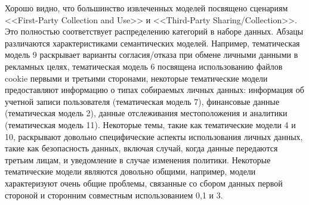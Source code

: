 \documentclass[../main]{subfiles}
\begin{document}
Хорошо видно, что большинство извлеченных моделей посвящено сценариям <<First-Party Collection and Use>> и <<Third-Party Sharing/Collection>>. Это полностью соответствует распределению категорий в наборе данных. Абзацы различаются характеристиками семантических моделей. Например, тематическая модель 9 раскрывает варианты согласия/отказа при обмене личными данными в рекламных целях, тематическая модель 6 посвящена использованию файлов cookie первыми и третьими сторонами, некоторые тематические модели предоставляют информацию о типах собираемых личных данных: информация об учетной записи пользователя (тематическая модель 7), финансовые данные (тематическая модель 2), данные отслеживания местоположения и аналитики (тематическая модель 11). Некоторые темы, такие как тематические модели 4 и 10, раскрывают довольно специфические аспекты использования личных данных, такие как безопасность данных, включая случай, когда данные передаются третьим лицам, и уведомление в случае изменения политики. Некоторые тематические модели являются довольно общими, например, модели характеризуют очень общие проблемы, связанные со сбором данных первой стороной и сторонним совместным использованием 0,1 и 3.
\end{document}
